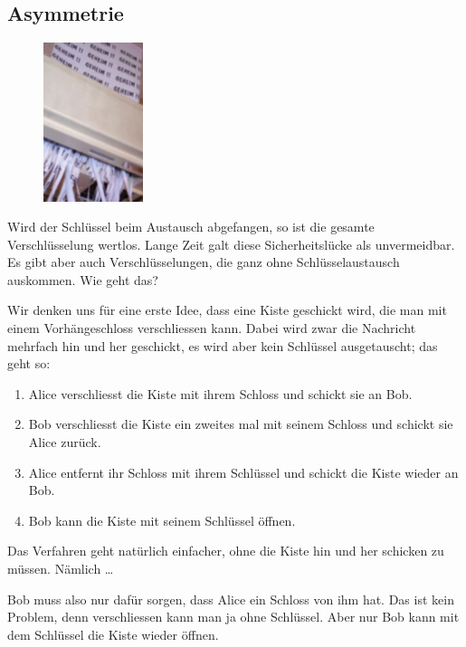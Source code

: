 \documentclass[%
<<<<<<< Updated upstream
11pt,%
twoside,%
titlepage,%
german,%
headsepline%
]{scrartcl}
\begin{document}
\begin{cdef}[Linksverschiebung]{}
\begin{cdef}{}
\subsection{Asymmetrie}

\begin{figure}
\vspace{-22pt}
  \begin{center}
    \includegraphics[width=0.26\textwidth]{pictures/rsa}
  \end{center}
\vspace{-22pt}
\end{figure}
Wird der Schlüssel beim Austausch abgefangen, so ist die gesamte Verschlüsselung wertlos. Lange Zeit galt diese Sicherheitslücke als unvermeidbar. Es gibt aber auch Verschlüsselungen, die ganz ohne Schlüsselaustausch auskommen. Wie geht das?

Wir denken uns für eine erste Idee, dass eine Kiste geschickt wird, die man mit einem Vorhängeschloss verschliessen kann. Dabei wird zwar die Nachricht mehrfach hin und her geschickt, es wird aber kein Schlüssel ausgetauscht; das geht so:
\begin{enumerate}
\item Alice verschliesst die Kiste mit ihrem Schloss und schickt sie an Bob.
\item Bob verschliesst die Kiste ein zweites mal mit seinem Schloss und schickt sie Alice zurück.
\item Alice entfernt ihr Schloss mit ihrem Schlüssel und schickt die Kiste wieder an Bob.
\item Bob kann die Kiste mit seinem Schlüssel öffnen.
\end{enumerate}
\begin{ueb}
Das Verfahren geht natürlich einfacher, ohne die Kiste hin und her schicken zu müssen. Nämlich \dots
\end{ueb}
Bob muss also nur dafür sorgen, dass Alice ein Schloss von ihm hat. Das ist kein Problem, denn verschliessen kann man ja ohne Schlüssel. Aber nur Bob kann mit dem Schlüssel die Kiste wieder öffnen.


\end{cdef}
\end{cdef}
\end{document}
